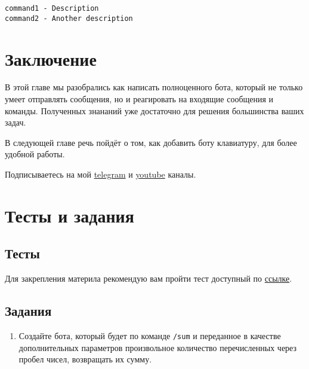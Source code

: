 \documentclass[
]{book}
\providecommand{\tightlist}{%
  \setlength{\itemsep}{0pt}\setlength{\parskip}{0pt}}
\begin{document}
\begin{verbatim}
command1 - Description
command2 - Another description
\end{verbatim}

\hypertarget{ux437ux430ux43aux43bux44eux447ux435ux43dux438ux435-1}{%
\section{Заключение}\label{ux437ux430ux43aux43bux44eux447ux435ux43dux438ux435-1}}

В этой главе мы разобрались как написать полноценного бота, который не только умеет отправлять сообщения, но и реагировать на входящие сообщения и команды. Полученных знананий уже достаточно для решения большинства ваших задач.

В следующей главе речь пойдёт о том, как добавить боту клавиатуру, для более удобной работы.

Подписываетесь на мой \href{https://t.me/R4marketing}{telegram} и \href{https://www.youtube.com/R4marketing/?sub_confirmation=1}{youtube} каналы.

\hypertarget{ux442ux435ux441ux442ux44b-ux438-ux437ux430ux434ux430ux43dux438ux44f-1}{%
\section{Тесты и задания}\label{ux442ux435ux441ux442ux44b-ux438-ux437ux430ux434ux430ux43dux438ux44f-1}}

\hypertarget{ux442ux435ux441ux442ux44b-1}{%
\subsection{Тесты}\label{ux442ux435ux441ux442ux44b-1}}

Для закрепления материла рекомендую вам пройти тест доступный по \href{https://onlinetestpad.com/t/build-tg-bot-in-r-2}{ссылке}.

\hypertarget{ux437ux430ux434ux430ux43dux438ux44f-1}{%
\subsection{Задания}\label{ux437ux430ux434ux430ux43dux438ux44f-1}}

\begin{enumerate}
\def\labelenumi{\arabic{enumi}.}
\tightlist
\item
  Создайте бота, который будет по команде \texttt{/sum} и переданное в качестве дополнительных параметров произвольное количество перечисленных через пробел чисел, возвращать их сумму.
\end{enumerate}
\end{document}

